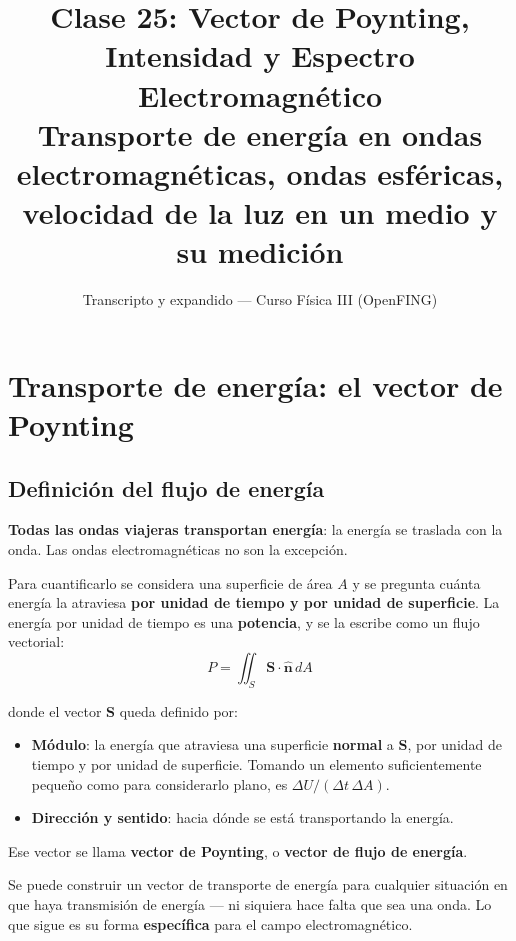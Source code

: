 \documentclass[12pt,a4paper]{article}
\title{\textbf{Clase 25: Vector de Poynting, Intensidad y Espectro
        Electromagnético}\\[0.3em]
        \large{Transporte de energía en ondas electromagnéticas, ondas
              esféricas, velocidad de la luz en un medio y su medición}}
\author{Transcripto y expandido --- Curso Física III (OpenFING)}
\date{}
\begin{document}
\maketitle
\thispagestyle{empty}
\newpage

\tableofcontents
\newpage

\section{Transporte de energía: el vector de Poynting}

\subsection{Definición del flujo de energía}

\textbf{Todas las ondas viajeras transportan energía}: la energía se traslada con
la onda. Las ondas electromagnéticas no son la excepción.

Para cuantificarlo se considera una superficie de área $A$ y se pregunta cuánta
energía la atraviesa \textbf{por unidad de tiempo y por unidad de superficie}. La
energía por unidad de tiempo es una \textbf{potencia}, y se la escribe como un
flujo vectorial:
\[
P = \iint_S \mathbf{S}\cdot\hat{\mathbf{n}}\, dA
\]

donde el vector $\mathbf{S}$ queda definido por:

\begin{itemize}
  \item \textbf{Módulo}: la energía que atraviesa una superficie \textbf{normal}
        a $\mathbf{S}$, por unidad de tiempo y por unidad de superficie. Tomando
        un elemento suficientemente pequeño como para considerarlo plano, es
        $\Delta U/(\Delta t\,\Delta A)$.
  \item \textbf{Dirección y sentido}: hacia dónde se está transportando la
        energía.
\end{itemize}

Ese vector se llama \textbf{vector de Poynting}, o \textbf{vector de flujo de
energía}.

\begin{notebox}
Se puede construir un vector de transporte de energía para cualquier situación en
que haya transmisión de energía --- ni siquiera hace falta que sea una onda. Lo
que sigue es su forma \textbf{específica} para el campo electromagnético.
\end{notebox}
\end{document}
